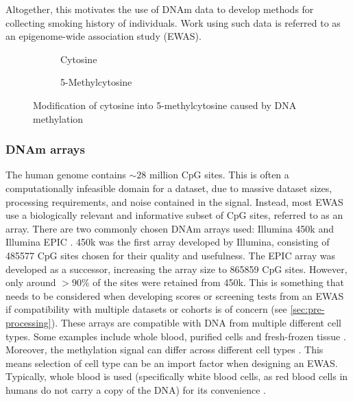 \documentclass[draft]{article} %
\begin{document}
Altogether, this motivates the use of DNAm data to develop methods for collecting smoking history of individuals. Work using such data is referred to as an epigenome-wide association study (EWAS).

\begin{figure}
    \begin{subfigure}{0.49\textwidth}
        \centering
        \hspace*{11mm}
        \vspace{3mm}
        \caption{Cytosine}
    \end{subfigure}
    \begin{subfigure}{0.49\textwidth}
        \centering
        \vspace{3mm}
        \caption{5-Methylcytosine}
    \end{subfigure}
    \caption[Methylation of cytosine]{Modification of cytosine into 5-methylcytosine caused by DNA methylation}
    \label{fig:cytosine-methylation}
\end{figure}

\subsubsection{DNAm arrays}
The human genome contains \(\sim\!28\) million CpG sites. This is often a computationally infeasible domain for a dataset, due to massive dataset sizes, processing requirements, and noise contained in the signal. Instead, most EWAS use a biologically relevant and informative subset of CpG sites, referred to as an array. There are two commonly chosen DNAm arrays used: Illumina 450k \cite{illumina2012methylation450} and Illumina EPIC \cite{illumina2015methylationepic}. 450k was the first array developed by Illumina, consisting of \num{485577} CpG sites chosen for their quality and usefulness. The EPIC array was developed as a successor, increasing the array size to \num{865859} CpG sites. However, only around \(>90\%\) of the sites were retained from 450k. This is something that needs to be considered when developing scores or screening tests from an EWAS if compatibility with multiple datasets or cohorts is of concern (see \ref{sec:pre-processing}). These arrays are compatible with DNA from multiple different cell types. Some examples include whole blood, purified cells and fresh-frozen tissue \cite{bhat2022data}. Moreover, the methylation signal can differ across different cell types \cite{huang2016epigenome}. This means selection of cell type can be an import factor when designing an EWAS. Typically, whole blood is used (specifically white blood cells, as red blood cells in humans do not carry a copy of the DNA) for its convenience \cite{houseman2015dna}.
\end{document}
